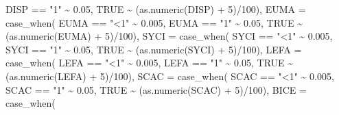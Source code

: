 \documentclass[
]{book}
\newenvironment{Shaded}{\begin{snugshade}}{\end{snugshade}}
\newcommand{\AttributeTok}[1]{\textcolor[rgb]{0.77,0.63,0.00}{#1}}
\newcommand{\ConstantTok}[1]{\textcolor[rgb]{0.00,0.00,0.00}{#1}}
\newcommand{\DecValTok}[1]{\textcolor[rgb]{0.00,0.00,0.81}{#1}}
\newcommand{\FloatTok}[1]{\textcolor[rgb]{0.00,0.00,0.81}{#1}}
\newcommand{\FunctionTok}[1]{\textcolor[rgb]{0.00,0.00,0.00}{#1}}
\newcommand{\NormalTok}[1]{#1}
\newcommand{\SpecialCharTok}[1]{\textcolor[rgb]{0.00,0.00,0.00}{#1}}
\newcommand{\StringTok}[1]{\textcolor[rgb]{0.31,0.60,0.02}{#1}}
\begin{document}
\begin{Shaded}
\begin{Highlighting}[]
\NormalTok{          DISP }\SpecialCharTok{==} \StringTok{"1"} \SpecialCharTok{\textasciitilde{}} \FloatTok{0.05}\NormalTok{, }
          \ConstantTok{TRUE} \SpecialCharTok{\textasciitilde{}}\NormalTok{ (}\FunctionTok{as.numeric}\NormalTok{(DISP) }\SpecialCharTok{+} \DecValTok{5}\NormalTok{)}\SpecialCharTok{/}\DecValTok{100}\NormalTok{),}
        \AttributeTok{EUMA =} \FunctionTok{case\_when}\NormalTok{(}
\NormalTok{          EUMA }\SpecialCharTok{==} \StringTok{"\textless{}1"} \SpecialCharTok{\textasciitilde{}} \FloatTok{0.005}\NormalTok{, }
\NormalTok{          EUMA }\SpecialCharTok{==} \StringTok{"1"} \SpecialCharTok{\textasciitilde{}} \FloatTok{0.05}\NormalTok{, }
          \ConstantTok{TRUE} \SpecialCharTok{\textasciitilde{}}\NormalTok{ (}\FunctionTok{as.numeric}\NormalTok{(EUMA) }\SpecialCharTok{+} \DecValTok{5}\NormalTok{)}\SpecialCharTok{/}\DecValTok{100}\NormalTok{),}
        \AttributeTok{SYCI =} \FunctionTok{case\_when}\NormalTok{(}
\NormalTok{          SYCI }\SpecialCharTok{==} \StringTok{"\textless{}1"} \SpecialCharTok{\textasciitilde{}} \FloatTok{0.005}\NormalTok{, }
\NormalTok{          SYCI }\SpecialCharTok{==} \StringTok{"1"} \SpecialCharTok{\textasciitilde{}} \FloatTok{0.05}\NormalTok{, }
          \ConstantTok{TRUE} \SpecialCharTok{\textasciitilde{}}\NormalTok{ (}\FunctionTok{as.numeric}\NormalTok{(SYCI) }\SpecialCharTok{+} \DecValTok{5}\NormalTok{)}\SpecialCharTok{/}\DecValTok{100}\NormalTok{),}
        \AttributeTok{LEFA =} \FunctionTok{case\_when}\NormalTok{(}
\NormalTok{          LEFA }\SpecialCharTok{==} \StringTok{"\textless{}1"} \SpecialCharTok{\textasciitilde{}} \FloatTok{0.005}\NormalTok{, }
\NormalTok{          LEFA }\SpecialCharTok{==} \StringTok{"1"} \SpecialCharTok{\textasciitilde{}} \FloatTok{0.05}\NormalTok{, }
          \ConstantTok{TRUE} \SpecialCharTok{\textasciitilde{}}\NormalTok{ (}\FunctionTok{as.numeric}\NormalTok{(LEFA) }\SpecialCharTok{+} \DecValTok{5}\NormalTok{)}\SpecialCharTok{/}\DecValTok{100}\NormalTok{),}
        \AttributeTok{SCAC =} \FunctionTok{case\_when}\NormalTok{(}
\NormalTok{          SCAC }\SpecialCharTok{==} \StringTok{"\textless{}1"} \SpecialCharTok{\textasciitilde{}} \FloatTok{0.005}\NormalTok{, }
\NormalTok{          SCAC }\SpecialCharTok{==} \StringTok{"1"} \SpecialCharTok{\textasciitilde{}} \FloatTok{0.05}\NormalTok{, }
          \ConstantTok{TRUE} \SpecialCharTok{\textasciitilde{}}\NormalTok{ (}\FunctionTok{as.numeric}\NormalTok{(SCAC) }\SpecialCharTok{+} \DecValTok{5}\NormalTok{)}\SpecialCharTok{/}\DecValTok{100}\NormalTok{),}
        \AttributeTok{BICE =} \FunctionTok{case\_when}\NormalTok{(}

\end{Highlighting}
\end{Shaded}
\end{document}
